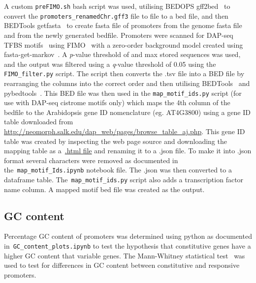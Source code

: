 A custom \texttt{preFIMO.sh} bash script was used, utilising BEDOPS gff2bed~\autocite{nephBEDOPSHighperformanceGenomic2012} to convert the \texttt{promoters\_renamedChr.gff3} file to file to a bed file, and then BEDTools getfasta~\autocite{quinlanBEDToolsFlexibleSuite2010} to create fasta file of
promoters from the genome fasta file and from the newly generated bedfile.
Promoters were scanned for DAP\hyp{}seq TFBS motifs~\autocite{omalleyCistromeEpicistromeFeatures2016} using FIMO~\autocite{grantFIMOScanningOccurrences2011} with a zero\hyp{}order background model created using fasta\hyp{}get\hyp{}markov~\autocite{baileyMEMESuiteTools2009}.
A \textit{p}-value threshold of  and max stored sequences  was used, and the output was filtered using a \textit{q}\hyp{}value threshold of 0.05 using the \texttt{FIMO\_filter.py} script.
The script then converts the .tsv file into a BED file by rearranging the columns into the correct order and then utilising BEDTools~\autocite{quinlanBEDToolsFlexibleSuite2010} and pybedtools~\autocite{dalePybedtoolsFlexiblePython2011}.
This BED file was then used in the \texttt{map\_motif\_ids.py} script (for use with DAP\hyp{}seq cistrome motifs only) which maps the 4th column of the bedfile to the Arabidopsis gene ID nomenclature (eg. AT4G3800) using a gene ID table downloaded from \url{http://neomorph.salk.edu/dap\_web/pages/browse\_table\_aj.php}.
This gene ID table was created by inspecting the web page source and
downloading the mapping table as
a~\href{http://neomorph.salk.edu/dev/pages/shhuang/dap_web/pages/dap-grid-data3.php?_=1573587374712}{.html
file} and renaming it to a .json file. To make it into .json format
several characters were removed as documented in the~\texttt{map\_motif\_Ids.ipynb} notebook file. The .json was then converted to a
dataframe table. The~\texttt{map\_motif\_ids.py} script also adds a
transcription factor name column. A mapped motif bed file was created as
the output.

\subsection{GC content}
{\label{gc-content}}

Percentage GC content of promoters was determined using python as documented
in~\texttt{GC\_content\_plots.ipynb} to test the hypothesis that constitutive genes have a higher GC content that variable genes. The Mann\hyp{}Whitney statistical test~\autocite{mannTestWhetherOne1947}
was used to test for differences in GC content between constitutive and responsive promoters.

